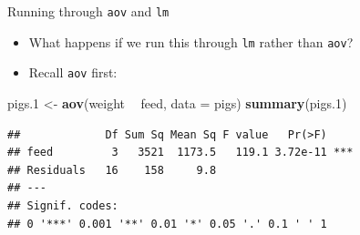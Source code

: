\documentclass[
  ignorenonframetext,
]{beamer}
\newenvironment{Shaded}{\begin{snugshade}}{\end{snugshade}}
\newcommand{\DataTypeTok}[1]{\textcolor[rgb]{0.13,0.29,0.53}{#1}}
\newcommand{\FloatTok}[1]{\textcolor[rgb]{0.00,0.00,0.81}{#1}}
\newcommand{\KeywordTok}[1]{\textcolor[rgb]{0.13,0.29,0.53}{\textbf{#1}}}
\newcommand{\NormalTok}[1]{#1}
\newcommand{\OperatorTok}[1]{\textcolor[rgb]{0.81,0.36,0.00}{\textbf{#1}}}
\newcommand{\StringTok}[1]{\textcolor[rgb]{0.31,0.60,0.02}{#1}}
\providecommand{\tightlist}{%
  \setlength{\itemsep}{0pt}\setlength{\parskip}{0pt}}
\begin{document}
\begin{frame}[fragile]{Running through \texttt{aov} and \texttt{lm}}
\protect\hypertarget{running-through-aov-and-lm}{}

\begin{itemize}
\tightlist
\item
  What happens if we run this through \texttt{lm} rather than
  \texttt{aov}?
\item
  Recall \texttt{aov} first:
\end{itemize}

\begin{Shaded}
\begin{Highlighting}[]
\NormalTok{pigs}\FloatTok{.1}\NormalTok{ <-}\StringTok{ }\KeywordTok{aov}\NormalTok{(weight }\OperatorTok{~}\StringTok{ }\NormalTok{feed, }\DataTypeTok{data =}\NormalTok{ pigs)}
\KeywordTok{summary}\NormalTok{(pigs}\FloatTok{.1}\NormalTok{)}
\end{Highlighting}
\end{Shaded}

\begin{verbatim}
##             Df Sum Sq Mean Sq F value   Pr(>F)    
## feed         3   3521  1173.5   119.1 3.72e-11 ***
## Residuals   16    158     9.8                     
## ---
## Signif. codes:  
## 0 '***' 0.001 '**' 0.01 '*' 0.05 '.' 0.1 ' ' 1
\end{verbatim}

\end{frame}
\end{document}
